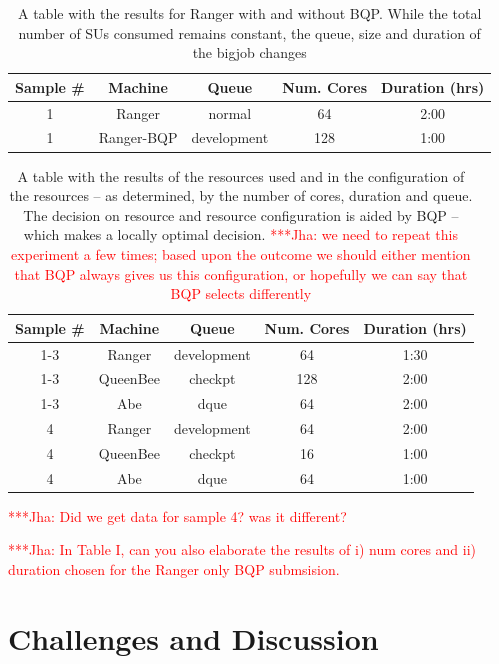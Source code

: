 \documentclass[conference,final]{IEEEtran}
\newcommand{\jhanote}[1]{ {\textcolor{red} { ***Jha: #1 }}}
\newcommand{\jhanote}[1]{}
\begin{document}
\begin{table}
\begin{tabular}{|c|c|c|c|c|}
\hline Sample \# & Machine & Queue & Num. Cores & Duration (hrs) \\ 
\hline 1 & Ranger & normal & 64 & 2:00 \\ 
\hline 1 & Ranger-BQP & development & 128 & 1:00 \\ 
\hline 
\end{tabular} 
\caption{A table with the results for Ranger with and without BQP. While the
    total number of SUs consumed remains constant, the queue, size and duration
    of the bigjob changes}
\end{table}


\begin{table}
\begin{tabular}{|c|c|c|c|c|}
\hline Sample \# & Machine & Queue & Num. Cores & Duration (hrs) \\ 
\hline 1-3 & Ranger & development & 64 & 1:30 \\ 
\hline 1-3 & QueenBee & checkpt & 128 & 2:00 \\ 
\hline 1-3 & Abe & dque & 64 & 2:00 \\ 
\hline 4 & Ranger & development & 64 & 2:00 \\ 
\hline 4 & QueenBee & checkpt & 16 & 1:00 \\ 
\hline 4 & Abe & dque & 64 & 1:00 \\ 
\hline 
\end{tabular} 
\caption{A table with the results of the resources used and in
  the configuration of the resources -- as determined, by the
  number of cores, duration and queue. The decision on
  resource and resource configuration is aided by BQP -- which 
  makes a locally optimal decision. \jhanote{we need to repeat
    this experiment a few times; based upon the outcome we should either
    mention that BQP always gives us this configuration, or hopefully we
    can say that BQP selects differently}}
\end{table}

\jhanote{Did we get data for sample 4? was it different?}

\jhanote{In Table I, can you also elaborate the results of i) num cores and
ii) duration chosen for the Ranger only BQP submsision.}



\section{Challenges and Discussion}
\end{document}
